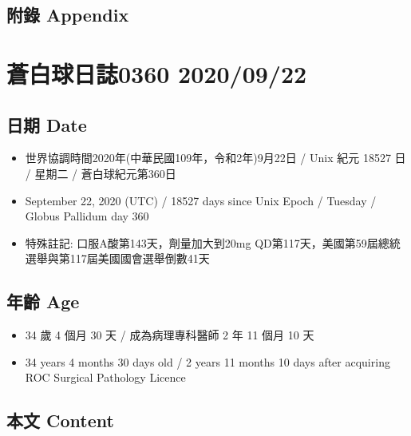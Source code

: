 \documentclass[
]{article}
\providecommand{\tightlist}{%
  \setlength{\itemsep}{0pt}\setlength{\parskip}{0pt}}
\begin{document}
\hypertarget{ux9644ux9304-appendix-20}{%
\subsection{附錄 Appendix}\label{ux9644ux9304-appendix-20}}

\hypertarget{ux84bcux767dux7403ux65e5ux8a8c0360-20200922}{%
\section{蒼白球日誌0360
2020/09/22}\label{ux84bcux767dux7403ux65e5ux8a8c0360-20200922}}

\hypertarget{ux65e5ux671f-date-21}{%
\subsection{日期 Date}\label{ux65e5ux671f-date-21}}

\begin{itemize}
\tightlist
\item
  世界協調時間2020年(中華民國109年，令和2年)9月22日 / Unix 紀元 18527 日
  / 星期二 / 蒼白球紀元第360日
\item
  September 22, 2020 (UTC) / 18527 days since Unix Epoch / Tuesday /
  Globus Pallidum day 360
\item
  特殊註記: 口服A酸第143天，劑量加大到20mg
  QD第117天，美國第59屆總統選舉與第117屆美國國會選舉倒數41天
\end{itemize}

\hypertarget{ux5e74ux9f61-age-21}{%
\subsection{年齡 Age}\label{ux5e74ux9f61-age-21}}

\begin{itemize}
\tightlist
\item
  34 歲 4 個月 30 天 / 成為病理專科醫師 2 年 11 個月 10 天
\item
  34 years 4 months 30 days old / 2 years 11 months 10 days after
  acquiring ROC Surgical Pathology Licence
\end{itemize}

\hypertarget{ux672cux6587-content-21}{%
\subsection{本文 Content}\label{ux672cux6587-content-21}}
\end{document}
